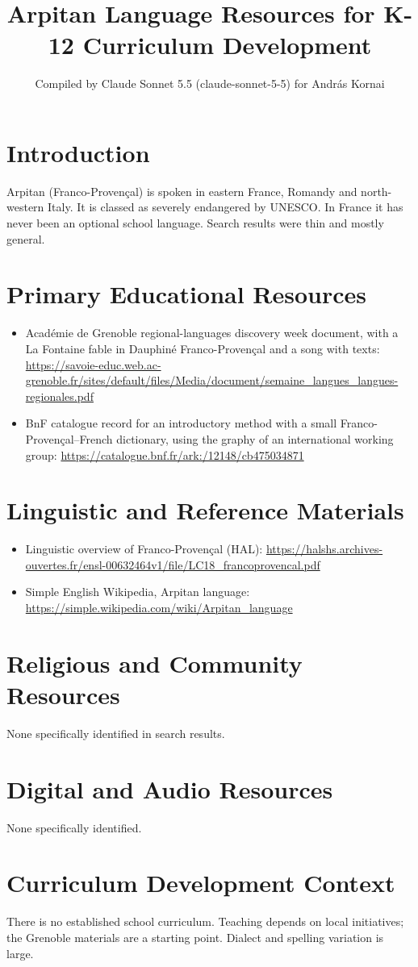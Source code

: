 \documentclass[12pt]{article}
\title{Arpitan Language Resources for K-12 Curriculum Development}
\author{Compiled by Claude Sonnet 5.5 (claude-sonnet-5-5) for Andr\'as Kornai}
\date{}
\begin{document}
\maketitle
\section{Introduction}
Arpitan (Franco-Proven\c{c}al) is spoken in eastern France, Romandy and north-western Italy. It is classed as severely endangered by UNESCO. In France it has never been an optional school language. Search results were thin and mostly general.
\section{Primary Educational Resources}
\begin{itemize}
\item Acad\'emie de Grenoble regional-languages discovery week document, with a La Fontaine fable in Dauphin\'e Franco-Proven\c{c}al and a song with texts: \url{https://savoie-educ.web.ac-grenoble.fr/sites/default/files/Media/document/semaine_langues_langues-regionales.pdf}
\item BnF catalogue record for an introductory method with a small Franco-Proven\c{c}al--French dictionary, using the graphy of an international working group: \url{https://catalogue.bnf.fr/ark:/12148/cb475034871}
\end{itemize}
\section{Linguistic and Reference Materials}
\begin{itemize}
\item Linguistic overview of Franco-Proven\c{c}al (HAL): \url{https://halshs.archives-ouvertes.fr/ensl-00632464v1/file/LC18_francoprovencal.pdf}
\item Simple English Wikipedia, Arpitan language: \url{https://simple.wikipedia.com/wiki/Arpitan_language}
\end{itemize}
\section{Religious and Community Resources}
None specifically identified in search results.
\section{Digital and Audio Resources}
None specifically identified.
\section{Curriculum Development Context}
There is no established school curriculum. Teaching depends on local initiatives; the Grenoble materials are a starting point. Dialect and spelling variation is large.
\end{document}
